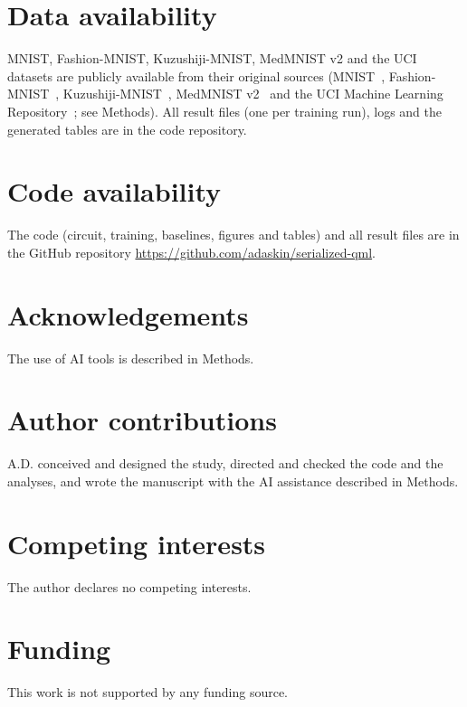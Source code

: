 \documentclass[11pt]{article}
\begin{document}
\section*{Data availability}
\label{sec:data-availability}
MNIST, Fashion-MNIST, Kuzushiji-MNIST, MedMNIST v2 and the UCI datasets are publicly available from their original sources (MNIST~\cite{lecun1998mnist}, Fashion-MNIST~\cite{xiao2017fashion}, Kuzushiji-MNIST~\cite{clanuwat2018kmnist}, MedMNIST v2~\cite{yang2023medmnist} and the UCI Machine Learning Repository~\cite{uci}; see Methods). All result files (one per training run), logs and the generated tables are in the code repository.

\section*{Code availability}
The code (circuit, training, baselines, figures and tables) and all result files are in the GitHub repository \url{https://github.com/adaskin/serialized-qml}.

\section*{Acknowledgements}
The use of AI tools is described in Methods.

\section*{Author contributions}
A.D. conceived and designed the study, directed and checked the code and the analyses, and wrote the manuscript with the AI assistance described in Methods.

\section*{Competing interests}
The author declares no competing interests.
\section*{Funding}
This work is not supported by any funding source.

% 

% 
\printbibliography
\clearpage
\appendix

\end{document}
